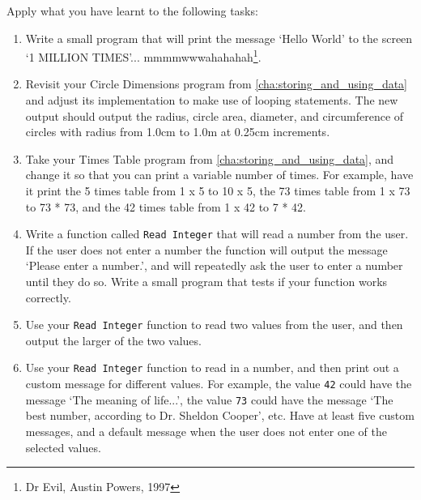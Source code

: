 Apply what you have learnt to the following tasks:
\begin{enumerate}
  \item Write a small program that will print the message `Hello World' to the screen `1 MILLION TIMES'... mmmmwwwahahahah\footnote{Dr Evil, Austin Powers, 1997}.
  \item Revisit your Circle Dimensions program from \cref{cha:storing_and_using_data} and adjust its implementation to make use of looping statements. The new output should output the radius, circle area, diameter, and circumference of circles with radius from 1.0cm to 1.0m at 0.25cm increments.
  \item Take your Times Table program from \cref{cha:storing_and_using_data}, and change it so that you can print a variable number of times. For example, have it print the 5 times table from 1 x 5 to 10 x 5, the 73 times table from 1 x 73 to 73 * 73, and the 42 times table from 1 x 42 to 7 * 42.  
  \item Write a function called \texttt{Read Integer} that will read a number from the user. If the user does not enter a number the function will output the message `Please enter a number.', and will repeatedly ask the user to enter a number until they do so. Write a small program that tests if your function works correctly.
  
  \begin{figure}[h]
  \end{figure}
  
  \item Use your \texttt{Read Integer} function to read two values from the user, and then output the larger of the two values.
  
  \item Use your \texttt{Read Integer} function to read in a number, and then print out a custom message for different values. For example, the value \texttt{42} could have the message `The meaning of life...', the value \texttt{73} could have the message `The best number, according to Dr. Sheldon Cooper', etc. Have at least five custom messages, and a default message when the user does not enter one of the selected values.
  

\end{enumerate}
